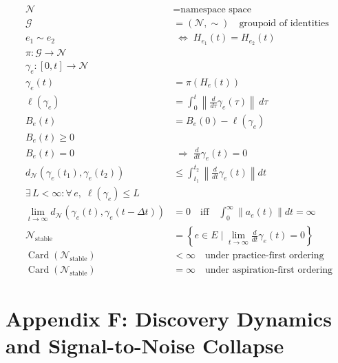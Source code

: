 \documentclass[11pt,oneside]{article}
\begin{document}
\begin{align}
\mathcal{N} &= \text{namespace space} \\[6pt]
\mathcal{G} &= (\mathcal{N}, \sim) \quad \text{groupoid of identities} \\[10pt]

e_1 \sim e_2
&\;\Longleftrightarrow\;
H_{e_1}(t) = H_{e_2}(t)
\\[12pt]

\pi : \mathcal{G} \rightarrow \mathcal{N}
\\[10pt]

\gamma_e : [0,t] \rightarrow \mathcal{N}
\\[6pt]

\gamma_e(t) &= \pi\!\left(H_e(t)\right)
\\[12pt]

\ell(\gamma_e)
&= \int_0^t
\left\|
\frac{d}{d\tau} \gamma_e(\tau)
\right\|
\, d\tau
\\[12pt]

B_e(t)
&= B_e(0) - \ell(\gamma_e)
\\[12pt]

B_e(t) \ge 0
\\[10pt]

B_e(t) = 0
&\;\Longrightarrow\;
\frac{d}{dt}\gamma_e(t) = 0
\\[12pt]

d_{\mathcal{N}}\!\left(
\gamma_e(t_1), \gamma_e(t_2)
\right)
&\le
\int_{t_1}^{t_2}
\left\|
\frac{d}{dt}\gamma_e(t)
\right\|
dt
\\[14pt]

\exists\, L < \infty :
\forall\, e,\;
\ell(\gamma_e) \le L
\\[12pt]

\lim_{t \to \infty}
d_{\mathcal{N}}\!\left(
\gamma_e(t), \gamma_e(t-\Delta t)
\right)
&= 0
\quad \text{iff} \quad
\int_0^\infty \|a_e(t)\| dt = \infty
\\[14pt]

\mathcal{N}_{\text{stable}}
&=
\left\{
e \in E \mid
\lim_{t \to \infty}
\frac{d}{dt}\gamma_e(t) = 0
\right\}
\\[12pt]

\operatorname{Card}(\mathcal{N}_{\text{stable}})
&< \infty
\quad \text{under practice-first ordering}
\\[10pt]

\operatorname{Card}(\mathcal{N}_{\text{stable}})
&= \infty
\quad \text{under aspiration-first ordering}
\end{align}

\section{Appendix F: Discovery Dynamics and Signal-to-Noise Collapse}
\end{document}
